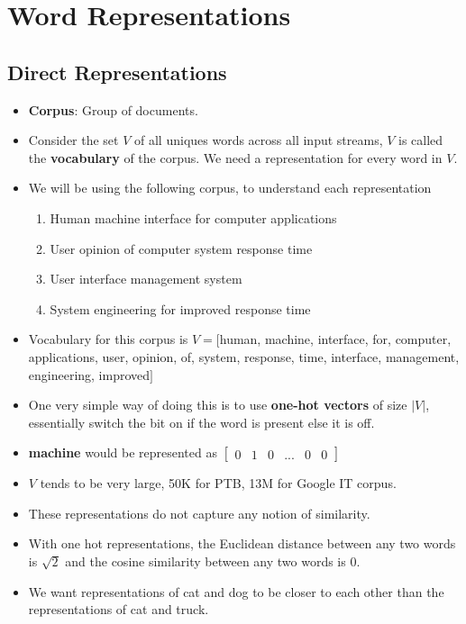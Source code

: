 \documentclass[a4paper]{article}
\begin{document}
\section{Word Representations}
\subsection{Direct Representations}
\begin{itemize}
    \item \textbf{Corpus}: Group of documents.
    \item Consider the set $V$ of all uniques words across all input streams, $V$ is called the \textbf{vocabulary} of the corpus. We need a representation for every word in $V$.
    \item We will be using the following corpus, to understand each representation
    \begin{enumerate}
        \item Human machine interface for computer applications
        \item User opinion of computer system response time
        \item User interface management system
        \item System engineering for improved response time
    \end{enumerate}
    \item Vocabulary for this corpus is $V=[$human, machine, interface, for, computer, applications, user, opinion, of, system, response, time, interface, management, engineering, improved$]$
    \item One very simple way of doing this is to use \textbf{one-hot vectors} of size $|V|$, essentially switch the bit on if the word is present else it is off.
    \item \textbf{machine} would be represented as $\begin{bmatrix}
        0&1&0&...&0&0
    \end{bmatrix}$
    \item $V$ tends to be very large, 50K for PTB, 13M for Google IT corpus.
    \item These representations do not capture any notion of similarity.
    \item With one hot representations, the Euclidean distance between any two words is $\sqrt{2}$ and the cosine similarity between any two words is $0$. 
    \item We want representations of cat and dog to be closer to each other than the representations of cat and truck.

\end{itemize}
\end{document}
